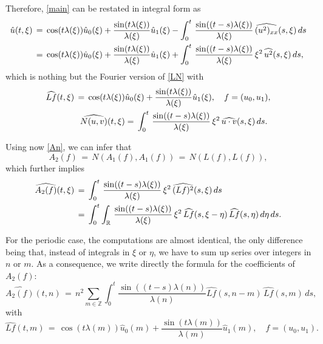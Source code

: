 \documentclass{amsart}
\begin{document}
Therefore, \eqref{main} can be restated in integral form as
\begin{equation}
\aligned
\hat{u}(t,\xi)\,&=\,\cos(t \lambda(\xi)) \hat{u}_0(\xi)+\frac{\sin(t \lambda(\xi))}{\lambda(\xi)} \hat{u}_1(\xi)-\int_0^t\,\frac{\sin((t-s) \lambda(\xi))}{\lambda(\xi)} \,\widehat{(u^2)_{xx}}(s,\xi)\,ds\\
&=\,\cos(t \lambda(\xi)) \hat{u}_0(\xi)+\frac{\sin(t \lambda(\xi))}{\lambda(\xi)} \hat{u}_1(\xi)+\int_0^t\,\frac{\sin((t-s) \lambda(\xi))}{\lambda(\xi)}\, \xi^2\, \widehat{u^2}(s,\xi)\,ds,\endaligned
\label{mainf}
\end{equation}
which is nothing but the Fourier version of \eqref{LN} with
\begin{equation}
\aligned
\widehat{Lf}(t,\xi)\,=\,\cos(t \lambda(\xi))& \hat{u}_0(\xi)+\frac{\sin(t \lambda(\xi))}{\lambda(\xi)} \hat{u}_1(\xi),\quad f=(u_0,u_1),\\
\widehat{N(u,v)}(t,\xi)&=\,\int_0^t\,\frac{\sin((t-s) \lambda(\xi))}{\lambda(\xi)}\, \xi^2\, \widehat{u\cdot v}(s,\xi)\,ds.\endaligned
\label{lnf}
\end{equation}

Using now \eqref{An}, we can infer that
\[
A_2(f)\,=\,N(A_1(f),A_1(f))\,=\,N(L(f),L(f)),\]
which further implies
\begin{equation}
\aligned
\widehat{A_2(f)}(t,\xi)\,&=\,\int_0^t\,\frac{\sin((t-s) \lambda(\xi))}{\lambda(\xi)}\, \xi^2\, \widehat{(Lf)^2}(s,\xi)\,ds\\
&=\,\int_0^t \int_{\mathbb{R}}\,\frac{\sin((t-s) \lambda(\xi))}{\lambda(\xi)}\, \xi^2\, \widehat{Lf}(s,\xi-\eta)\,\widehat{Lf}(s,\eta)\,d\eta\,ds.\endaligned
\label{A2f}
\end{equation}

For the periodic case, the computations are almost identical, the only difference being that, instead of integrals in $\xi$ or $\eta$, we have to sum up series over integers in $n$ or $m$. As a consequence, we write directly the formula for the coefficients of $A_2(f)$:
\begin{equation}
\widehat{A_2(f)}(t,n)\,=\, n^2 \sum_{m\in\mathbb{Z}} \int_0^t \frac{\sin((t-s) \lambda(n))}{\lambda(n)} \widehat{Lf}(s,n-m)\,\widehat{Lf}(s,m)\,ds,
\label{A2p}\end{equation}
with
\[
\widehat{Lf}(t,m)\,=\,\cos(t \lambda(m)) \hat{u}_0(m)+\frac{\sin(t \lambda(m))}{\lambda(m)} \hat{u}_1(m),\quad f=(u_0,u_1).\]
\end{document}
